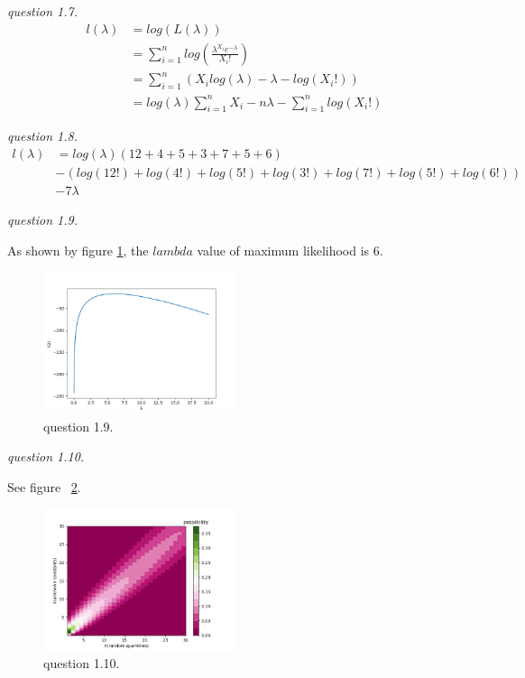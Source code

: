 \documentclass{article}
\begin{document}
\vspace{\baselineskip}
\textit{question 1.7.}
\begin{align*}
    l(\lambda)&=log(L(\lambda))\\&=\sum_{i=1}^nlog(\frac{\lambda^{X_i}e^{-\lambda}}{X_i!})\\&=\sum_{i=1}^n(X_ilog(\lambda) - \lambda - log(X_i!))\\&= log(\lambda)\sum_{i=1}^n X_i - n\lambda - \sum_{i=1}^nlog(X_i!)
\end{align*}

\vspace{\baselineskip}
\textit{question 1.8.}
\begin{align*}
    l(\lambda)&=log(\lambda)(12+4+5+3+7+5+6) \\&- (log(12!)+log(4!)+log(5!)+log(3!)+log(7!)+log(5!)+log(6!)) \\&- 7\lambda
\end{align*}

\vspace{\baselineskip}
\textit{question 1.9.}

As shown by figure \ref{fig:1-9}, the $lambda$ value of maximum likelihood is 6.

\begin{figure}[H]
    \centering
    \includegraphics[width=0.5\textwidth]{1-9}
    \caption{question 1.9.}
    \label{fig:1-9}
\end{figure}

\vspace{\baselineskip}
\textit{question 1.10.}

See figure ~\ref{fig:1-10}.

\begin{figure}[H]
    \centering
        \includegraphics[width=0.5\textwidth]{1-10}
    \caption{question 1.10.}
    \label{fig:1-10}
\end{figure}
\end{document}
